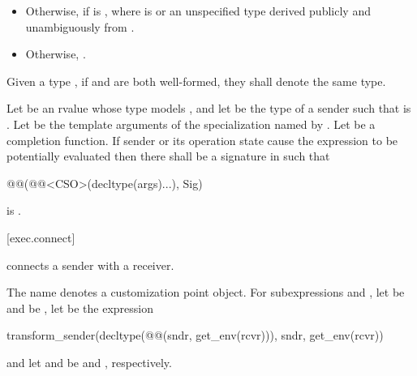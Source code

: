 \begin{itemdescr}
\begin{itemize}
\item
Otherwise,
if  is ,
where  is
 or
an unspecified type derived publicly and unambiguously from
.

\item
Otherwise,
.
\end{itemize}

\pnum
Given a type , if
 and
are both well-formed,
they shall denote the same type.
\end{itemdescr}

\pnum
Let  be an rvalue
whose type  models , and
let  be the type of a sender
such that  is .
Let  be the template arguments of
the  specialization
named by .
Let  be a completion function.
If sender  or its operation state cause
the expression 
to be potentially evaluated
then there shall be a signature  in 
such that
\begin{codeblock}
@@(@@<CSO>(decltype(args)...), Sig)
\end{codeblock}
is .

[exec.connect]{}

\pnum
{} connects a sender with a receiver.

\pnum
The name  denotes a customization point object.
For subexpressions  and ,
let  be  and
 be ,
let  be the expression
\begin{codeblock}
transform_sender(decltype(@@(sndr, get_env(rcvr))){}, sndr, get_env(rcvr))
\end{codeblock}
and let  and  be
 and , respectively.

